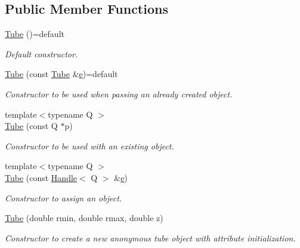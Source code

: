 \subsection*{Public Member Functions}
\begin{DoxyCompactItemize}
\item 
\hyperlink{class_d_d4hep_1_1_geometry_1_1_tube_af8531ba0aad4d787a21025d22b89f93e}{Tube} ()=default
\begin{DoxyCompactList}\small\item\em Default constructor. \end{DoxyCompactList}\item 
\hyperlink{class_d_d4hep_1_1_geometry_1_1_tube_a1aedf7737593e86112e0f14704a428a1}{Tube} (const \hyperlink{class_d_d4hep_1_1_geometry_1_1_tube}{Tube} \&\hyperlink{_volumes_8cpp_a8a9a1f93e9b09afccaec215310e64142}{e})=default
\begin{DoxyCompactList}\small\item\em Constructor to be used when passing an already created object. \end{DoxyCompactList}\item 
{\footnotesize template$<$typename Q $>$ }\\\hyperlink{class_d_d4hep_1_1_geometry_1_1_tube_afb6ca694ec53edb539b34b90d78c750f}{Tube} (const Q $\ast$p)
\begin{DoxyCompactList}\small\item\em Constructor to be used with an existing object. \end{DoxyCompactList}\item 
{\footnotesize template$<$typename Q $>$ }\\\hyperlink{class_d_d4hep_1_1_geometry_1_1_tube_ab21bc287433e3e7e284dcf6d10dccfd6}{Tube} (const \hyperlink{class_d_d4hep_1_1_handle}{Handle}$<$ Q $>$ \&\hyperlink{_volumes_8cpp_a8a9a1f93e9b09afccaec215310e64142}{e})
\begin{DoxyCompactList}\small\item\em Constructor to assign an object. \end{DoxyCompactList}\item 
\hyperlink{class_d_d4hep_1_1_geometry_1_1_tube_a8c7646c72431590ee08498dccd5db2cf}{Tube} (double rmin, double rmax, double z)
\begin{DoxyCompactList}\small\item\em Constructor to create a new anonymous tube object with attribute initialization. \end{DoxyCompactList}\item 

\end{DoxyCompactItemize}
